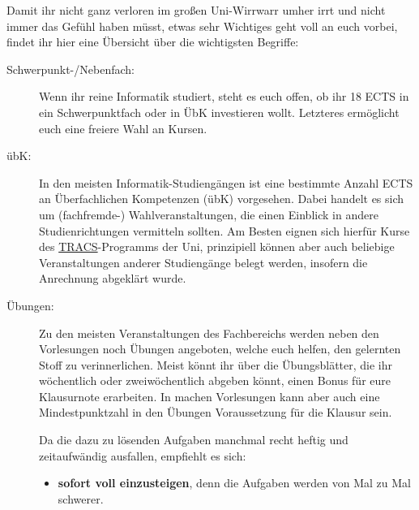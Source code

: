 Damit ihr nicht ganz verloren im gro\ss en Uni-Wirrwarr umher irrt und
  nicht immer das Gefühl haben müsst, etwas sehr Wichtiges geht
  voll an euch vorbei, findet ihr hier eine Übersicht über die wichtigsten Begriffe:

\begin{description}



\item [Schwerpunkt-/Nebenfach:] Wenn ihr reine Informatik studiert, steht es
  euch offen, ob ihr 18 ECTS in ein Schwerpunktfach oder in ÜbK
 investieren wollt. Letzteres ermöglicht euch eine freiere Wahl an Kursen.
  
\item [übK:] In den meisten Informatik-Studiengängen ist eine bestimmte Anzahl ECTS an Überfachlichen Kompetenzen (übK) vorgesehen. Dabei handelt es sich um (fachfremde-) Wahlveranstaltungen, die einen Einblick in andere Studienrichtungen vermitteln sollten. Am Besten eignen sich hierfür Kurse des \href{https://uni-tuebingen.de/studium/studienangebot/ueberfachliche-kompetenzen/transdisciplinary-course-program/}{TRACS}-Programms der Uni, prinzipiell können aber auch beliebige Veranstaltungen anderer Studiengänge belegt werden, insofern die Anrechnung abgeklärt wurde.

\item [Übungen:] Zu den meisten Veranstaltungen des Fachbereichs werden neben den Vorlesungen noch Übungen angeboten, welche euch helfen, den gelernten Stoff zu verinnerlichen. Meist könnt ihr über die Übungsblätter, die ihr wöchentlich oder zweiwöchentlich abgeben könnt, einen Bonus für eure Klausurnote erarbeiten. In machen Vorlesungen kann aber auch eine Mindestpunktzahl in den Übungen Voraussetzung für die Klausur sein.

Da die dazu zu lösenden Aufgaben manchmal recht heftig und zeitaufwändig ausfallen, empfiehlt es sich:

\begin{itemize}

\item \textbf{sofort voll einzusteigen}, denn die Aufgaben werden von Mal
  zu Mal schwerer.


\end{itemize}
\end{description}
